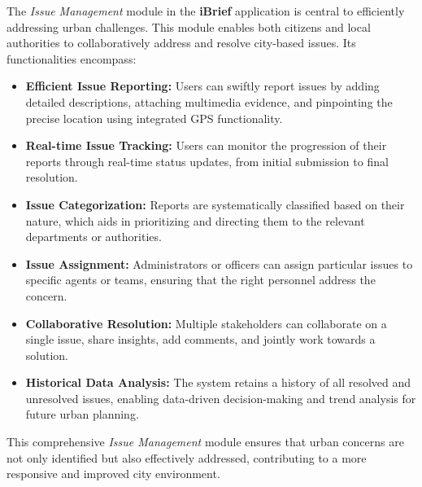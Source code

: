The \textit{Issue Management} module in the \textbf{iBrief} application is central to efficiently addressing urban challenges. This module enables both citizens and local authorities to collaboratively address and resolve city-based issues. Its functionalities encompass:

\begin{itemize}
    \item \textbf{Efficient Issue Reporting:}
    Users can swiftly report issues by adding detailed descriptions, attaching multimedia evidence, and pinpointing the precise location using integrated GPS functionality.
    
    \item \textbf{Real-time Issue Tracking:}
    Users can monitor the progression of their reports through real-time status updates, from initial submission to final resolution.
    
    \item \textbf{Issue Categorization:}
    Reports are systematically classified based on their nature, which aids in prioritizing and directing them to the relevant departments or authorities.
    
    \item \textbf{Issue Assignment:}
    Administrators or officers can assign particular issues to specific agents or teams, ensuring that the right personnel address the concern.
    
    \item \textbf{Collaborative Resolution:}
    Multiple stakeholders can collaborate on a single issue, share insights, add comments, and jointly work towards a solution.
    
    \item \textbf{Historical Data Analysis:}
    The system retains a history of all resolved and unresolved issues, enabling data-driven decision-making and trend analysis for future urban planning.
\end{itemize}

This comprehensive \textit{Issue Management} module ensures that urban concerns are not only identified but also effectively addressed, contributing to a more responsive and improved city environment.

